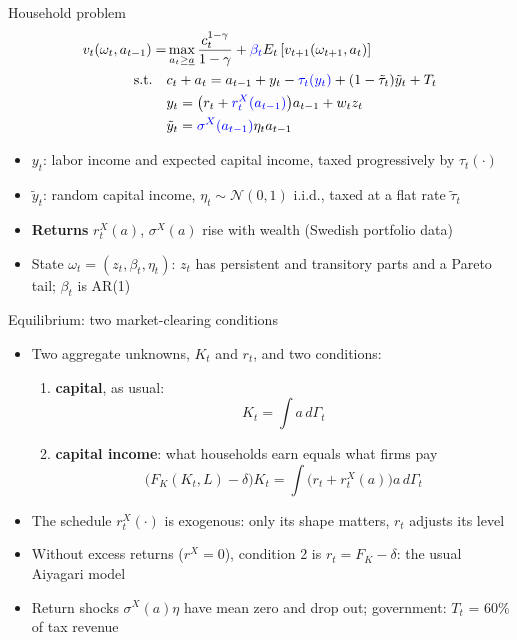 \documentclass[10pt,english,10pt]{beamer}
\begin{document}
\begin{frame}{Household problem}
\[
\begin{aligned}v_{t}(\omega_{t},a_{t-1})= & \max_{a_{t}\geq\underline{a}}\frac{c_{t}^{1-\gamma}}{1-\gamma}+\textcolor{blue}{\beta_{t}}E_{t}\left[v_{t+1}(\omega_{t+1},a_{t})\right]\\
\text{s.t.}\quad & c_{t}+a_{t}=a_{t-1}+y_{t}-\textcolor{blue}{\tau_{t}(y_{t})}+(1-\tilde{\tau}_{t})\tilde{y}_{t}+T_{t}\\
 & y_{t}=\big(r_{t}+\textcolor{blue}{r_{t}^{X}(a_{t-1})}\big)a_{t-1}+w_{t}z_{t}\\
 & \tilde{y}_{t}=\textcolor{blue}{\sigma^{X}(a_{t-1})}\eta_{t}a_{t-1}
\end{aligned}
\]
{\small
\begin{itemize}
\item $y_{t}$: labor income and expected capital income, taxed progressively by $\tau_{t}(\cdot)$
\item $\tilde{y}_{t}$: random capital income, $\eta_{t}\sim\mathcal{N}(0,1)$ i.i.d., taxed at a flat rate $\tilde{\tau}_{t}$
\item \textbf{Returns} $r_{t}^{X}(a)$, $\sigma^{X}(a)$ rise with wealth (Swedish portfolio data)
\item State $\omega_{t}=(z_{t},\beta_{t},\eta_{t})$: $z_{t}$ has persistent and transitory parts and a Pareto tail; $\beta_{t}$ is AR(1)
\end{itemize}}
\end{frame}

\begin{frame}{Equilibrium: two market-clearing conditions}
\begin{itemize}
\item Two aggregate unknowns, $K_{t}$ and $r_{t}$, and two conditions:
\begin{enumerate}
\item \textbf{capital}, as usual:
\[
K_{t}=\int a\,d\Gamma_{t}
\]
\item \textbf{capital income}: what households earn equals what firms pay
\[
\big(F_{K}(K_{t},L)-\delta\big)K_{t}=\int\big(r_{t}+r_{t}^{X}(a)\big)a\,d\Gamma_{t}
\]
\end{enumerate}
\item The schedule $r_{t}^{X}(\cdot)$ is exogenous: only its shape matters, $r_{t}$ adjusts its level
\item Without excess returns ($r^{X}=0$), condition 2 is $r_{t}=F_{K}-\delta$: the usual Aiyagari model
\item Return shocks $\sigma^{X}(a)\eta$ have mean zero and drop out; government: $T_{t}$ = 60\% of tax revenue
\end{itemize}
\end{frame}
\end{document}
